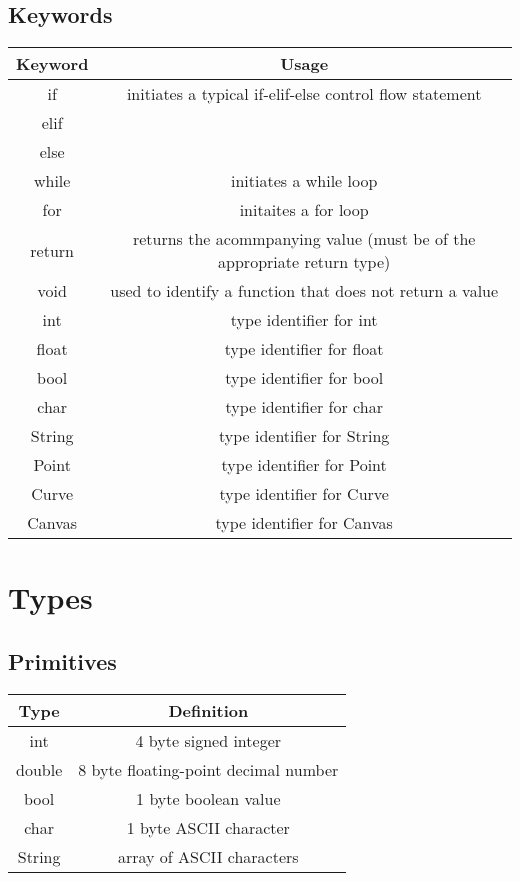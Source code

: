\documentclass{article}
\begin{document}
\subsection{Keywords}
\begin{center}
\begin{tabular}{ |c c| }
    \hline 
    \bf Keyword & \bf Usage \\
    \hline
    if & initiates a typical if-elif-else control flow statement \\
    elif \\   
    else \\
    while & initiates a while loop \\
    for & initaites a for loop \\
    return & returns the acommpanying value (must be of the appropriate return type) \\
    void & used to identify a function that does not return a value \\
    int & type identifier for int \\
    float & type identifier for float \\
    bool & type identifier for bool \\
    char & type identifier for char \\
    String & type identifier for String \\
    Point & type identifier for Point \\
    Curve & type identifier for Curve \\
    Canvas & type identifier for Canvas \\
    \hline
\end{tabular}
\end{center}




\section{Types}
\subsection{Primitives}
\begin{center}
\begin{tabular}{ |c c| }
    \hline 
    \bf Type & \bf Definition \\
    \hline
    int & 4 byte signed integer \\
    double & 8 byte floating-point decimal number \\
    bool & 1 byte boolean value \\
    char & 1 byte ASCII character \\
    String & array of ASCII characters \\
    \hline
\end{tabular}
\end{center}
\end{document}
